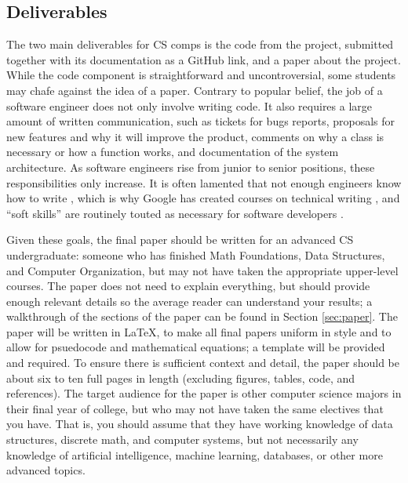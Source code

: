 \documentclass[10pt,twocolumn]{article}
\begin{document}
\subsection{Deliverables}

The two main deliverables for CS comps is the code from the project, submitted together with its documentation as a GitHub link, and a paper about the project.
While the code component is straightforward and uncontroversial, some students may chafe against the idea of a paper.
Contrary to popular belief, the job of a software engineer does not only involve writing code.
It also requires a large amount of written communication, such as tickets for bugs reports, proposals for new features and why it will improve the product, comments on why a class is necessary or how a function works, and documentation of the system architecture.
As software engineers rise from junior to senior positions, these responsibilities only increase.
It is often lamented that not enough engineers know how to write \cite{Mei2018WhyDevelopersShould,Alton2020WhyEveryDeveloper}, which is why Google has created courses on technical writing \cite{GoogleTechnicalWriting}, and ``soft skills'' are routinely touted as necessary for software developers \cite{Indeed202111ImportantSoft}.

Given these goals, the final paper should be written for an advanced CS undergraduate: someone who has finished Math Foundations, Data Structures, and Computer Organization, but may not have taken the appropriate upper-level courses.
The paper does not need to explain everything, but should provide enough relevant details so the average reader can understand your results; a walkthrough of the sections of the paper can be found in Section \ref{sec:paper}.
The paper will be written in LaTeX, to make all final papers uniform in style and to allow for psuedocode and mathematical equations; a template will be provided and required.
To ensure there is sufficient context and detail, the paper should be about six to ten full pages in length (excluding figures, tables, code, and references).
The target audience for the paper is other computer science majors in their final year of college, but who may not have taken the same electives that you have.
That is, you should assume that they have working knowledge of data structures, discrete math, and computer systems, but not necessarily any knowledge of artificial intelligence, machine learning, databases, or other more advanced topics.
\end{document}
